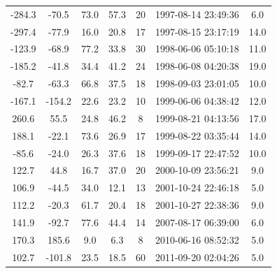 \documentclass[12pt,a4paper]{report}
\begin{document}
\begin{longtable}{|c|c|c|c|c|c|c|}
-284.3 & -70.5 & 73.0 & 57.3 &  20 & 1997-08-14 23:49:36 & 6.0 \\
-297.4 & -77.9 & 16.0 & 20.8 &  17 & 1997-08-15 23:17:19 & 14.0 \\
-123.9 & -68.9 & 77.2 & 33.8 &  30 & 1998-06-06 05:10:18 & 11.0 \\
-185.2 & -41.8 & 34.4 & 41.2 &  24 & 1998-06-08 04:20:38 & 19.0 \\
-82.7 & -63.3 & 66.8 & 37.5 &  18 & 1998-09-03 23:01:05 & 10.0 \\
-167.1 & -154.2 & 22.6 & 23.2 &  10 & 1999-06-06 04:38:42 & 12.0 \\
260.6 & 55.5 & 24.8 & 46.2 &   8 & 1999-08-21 04:13:56 & 17.0 \\
188.1 & -22.1 & 73.6 & 26.9 &  17 & 1999-08-22 03:35:44 & 14.0 \\
-85.6 & -24.0 & 26.3 & 37.6 &  18 & 1999-09-17 22:47:52 & 10.0 \\
122.7 & 44.8 & 16.7 & 37.0 &  20 & 2000-10-09 23:56:21 & 9.0 \\
106.9 & -44.5 & 34.0 & 12.1 &  13 & 2001-10-24 22:46:18 & 5.0 \\
112.2 & -20.3 & 61.7 & 20.4 &  18 & 2001-10-27 22:38:36 & 9.0 \\
141.9 & -92.7 & 77.6 & 44.4 &  14 & 2007-08-17 06:39:00 & 6.0 \\
170.3 & 185.6 & 9.0 & 6.3 &   8 & 2010-06-16 08:52:32 & 5.0 \\
102.7 & -101.8 & 23.5 & 18.5 &  60 & 2011-09-20 02:04:26 & 5.0 \\
\hline
\end{longtable}
\end{document}
